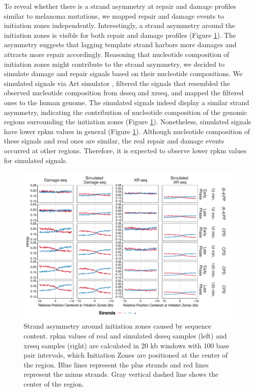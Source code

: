 To reveal whether there is a strand asymmetry at repair and damage profiles similar to melanoma mutations, we mapped repair and damage events to initiation zones independently. Interestingly, a strand asymmetry around the initiation zones is visible for both repair and damage profiles (Figure \ref{fig:simulation}). The asymmetry suggests that lagging template strand harbors more damages and attracts more repair accordingly. Reasoning that nucleotide composition of initiation zones might contribute to the strand asymmetry, we decided to simulate damage and repair signals based on their nucleotide compositions. We simulated signals via Art simulator \citep{huang2012art}, filtered the signals that resembled the observed nucleotide composition from \gls{dsseq} and \gls{xrseq}, and mapped the filtered ones to the human genome. The simulated signals indeed display a similar strand asymmetry, indicating the contribution of nucleotide composition of the genomic regions surrounding the initiation zones (Figure \ref{fig:simulation}). Nonetheless, simulated signals have lower \gls{rpkm} values in general (Figure \ref{fig:simulation}). Although nucleotide composition of these signals and real ones are similar, the real repair and damage events occurred at other regions. Therefore, it is expected to observe lower \gls{rpkm} values for simulated signals. 

\begin{figure}[H]
    \begin{center}
    \includegraphics[width=\textwidth]{Chapters/4_results/figures/fig5}
    \caption[Strand asymmetry around initiation zones caused by sequence content.]{Strand asymmetry around initiation zones caused by sequence content. \gls{rpkm} values of real and simulated \gls{dsseq} samples (left) and \gls{xrseq} samples (right) are calculated in 20 \gls{kb} windows with 100 base pair intervals, which Initiation Zones are positioned at the center of the region. Blue lines represent the plus strands and red lines represent the minus strands. Gray vertical dashed line shows the center of the region.}
    \label{fig:simulation}
    \end{center}
    \end{figure}

